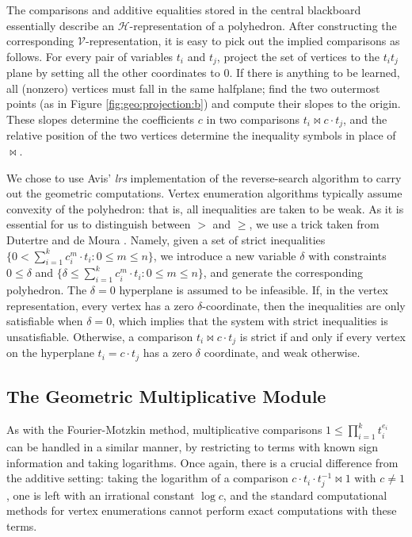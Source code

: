 \documentclass[runningheds]{llncs}
\begin{document}
The comparisons and additive equalities stored in the central
blackboard essentially describe an $\mathcal{H}$-representation of a
polyhedron. After constructing the corresponding
$\mathcal{V}$-representation, it is easy to pick out the implied
comparisons as follows. For every pair of variables $t_i$ and $t_j$,
project the set of vertices to the $t_i t_j$ plane by setting all the other coordinates to $0$. If there is anything to be learned, all (nonzero) vertices must fall in the same halfplane; find the two outermost points (as in Figure \ref{fig:geo:projection:b}) and compute their slopes to the origin. These slopes determine the coefficients $c$ in two comparisons $t_i \bowtie c \cdot t_j$, and the relative position of the two vertices determine the inequality symbols in place of $\bowtie$.



We chose to use Avis' \emph{lrs} implementation of the reverse-search
algorithm \cite{avis:00} to carry out the geometric computations.
Vertex enumeration algorithms typically assume convexity of the
polyhedron: that is, all inequalities are taken to be weak. As it is
essential for us to distinguish between $>$ and $\geq$, we use a trick
taken from Dutertre and de Moura \cite[Section
5]{dutertre:de:moura:06}. Namely, given a set of strict inequalities $\{0 <
\sum_{i=1}^k c^m_i \cdot t_i: 0\leq m \leq n\}$, we introduce a new
variable $\delta$ with constraints $0 \leq \delta$ and $\{\delta \leq
\sum_{i=1}^k c^m_i \cdot t_i: 0\leq m \leq n\}$, and generate the corresponding polyhedron. The $\delta=0$ hyperplane is assumed to be infeasible.
If, in the vertex representation, every vertex has a zero $\delta$-coordinate, then the inequalities are only satisfiable when $\delta = 0$, which implies that the system with strict inequalities is unsatisfiable. Otherwise, a comparison $t_i \bowtie c\cdot t_j$ is strict if and only if every vertex on the hyperplane $t_i = c\cdot t_j$ has a zero $\delta$ coordinate, and weak otherwise.




\subsection{The Geometric Multiplicative Module}
\label{subsection:multiplicative:geometric}

As with the Fourier-Motzkin method, multiplicative comparisons $1 \leq \prod_{i=1}^k t_i^{e_i}$ can be handled in a similar manner, by restricting to terms with known sign information and taking logarithms. Once again, there is a crucial difference from the additive setting: taking the logarithm of a comparison $c\cdot t_i \cdot t_j^{-1} \bowtie 1$ with $c\neq 1$, one is left with an irrational constant $\log c$, and the standard computational methods for vertex enumerations cannot perform exact computations with these terms.
\end{document}
